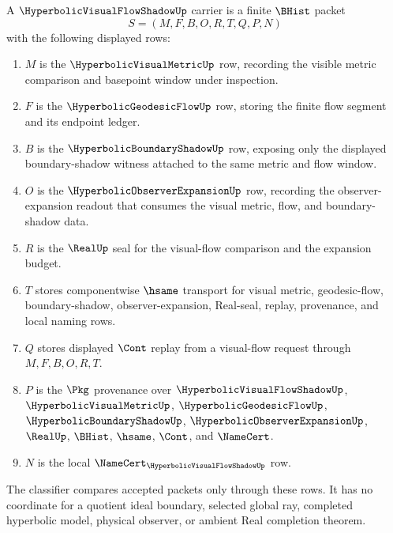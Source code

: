 \begin{definition}
\label{def:hyperbolic-visual-flow-shadow-carrier}
A $\HyperbolicVisualFlowShadowUp$ carrier is a finite $\BHist$ packet
$$
S=(M,F,B,O,R,T,Q,P,N)
$$
with the following displayed rows:
\begin{enumerate}
\item $M$ is the $\HyperbolicVisualMetricUp$ row, recording the visible metric comparison and basepoint window under inspection.
\item $F$ is the $\HyperbolicGeodesicFlowUp$ row, storing the finite flow segment and its endpoint ledger.
\item $B$ is the $\HyperbolicBoundaryShadowUp$ row, exposing only the displayed boundary-shadow witness attached to the same metric and flow window.
\item $O$ is the $\HyperbolicObserverExpansionUp$ row, recording the observer-expansion readout that consumes the visual metric, flow, and boundary-shadow data.
\item $R$ is the $\RealUp$ seal for the visual-flow comparison and the expansion budget.
\item $T$ stores componentwise $\hsame$ transport for visual metric, geodesic-flow, boundary-shadow, observer-expansion, Real-seal, replay, provenance, and local naming rows.
\item $Q$ stores displayed $\Cont$ replay from a visual-flow request through $M,F,B,O,R,T$.
\item $P$ is the $\Pkg$ provenance over $\HyperbolicVisualFlowShadowUp$, $\HyperbolicVisualMetricUp$, $\HyperbolicGeodesicFlowUp$, $\HyperbolicBoundaryShadowUp$, $\HyperbolicObserverExpansionUp$, $\RealUp$, $\BHist$, $\hsame$, $\Cont$, and $\NameCert$.
\item $N$ is the local $\NameCert_{\HyperbolicVisualFlowShadowUp}$ row.
\end{enumerate}
The classifier compares accepted packets only through these rows. It has no coordinate for a quotient ideal boundary, selected global ray, completed hyperbolic model, physical observer, or ambient Real completion theorem.
\end{definition}

